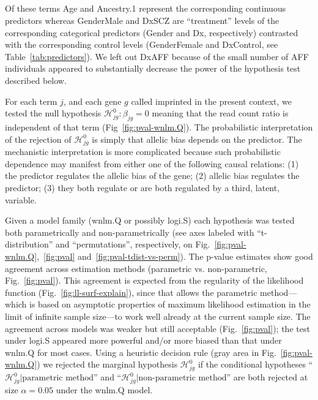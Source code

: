 \documentclass[letterpaper]{article}
\begin{document}
\subsection{}

Of these terms Age
and Ancestry.1 represent the corresponding continuous predictors whereas
GenderMale and DxSCZ are “treatment” levels of the corresponding categorical
predictors (Gender and Dx, respectively) contrasted with the corresponding
control levels (GenderFemale and DxControl, see Table~\ref{tab:predictors}).
We left out DxAFF because of the small number of AFF individuals appeared to
substantially decrease the power of the hypothesis test described below.

For each term \(j\), and each gene \(g\) called imprinted in the present
context, we tested the null hypothesis \(\mathcal{H}^0_{jg} : \beta_{jg} = 0\)
meaning that the read count ratio is independent of that term
(Fig~\ref{fig:pval-wnlm.Q}).  The probabilistic interpretation of the
rejection of \(\mathcal{H}^0_{jg}\) is simply that allelic bias depends on
the predictor.  The mechanistic interpretation is more complicated because
such probabilistic dependence may manifest from either one of the following
causal relations: (1) the predictor regulates the allelic bias of the gene;
(2) allelic bias regulates the predictor; (3) they both regulate or are both
regulated by a third, latent, variable.

Given a model family (wnlm.Q or possibly logi.S) each hypothesis was tested
both parametrically and non-parametrically (see axes labeled with
``t-distribution'' and ``permutations'', respectively, on
Fig.~\ref{fig:pval-wnlm.Q},~\ref{fig:pval} and~\ref{fig:pval-tdist-vs-perm}).
The p-value estimates show good agreement across estimation methods
(parametric vs. non-parametric, Fig.~\ref{fig:pval}). This agreement is
expected from the regularity of the likelihood function
(Fig.~\ref{fig:ll-surf-explain}), since that allows the parametric
method---which is based on asymptotic properties of maximum likelihood
estimation in the limit of infinite sample size---to work well already at the
current sample size. The agreement across models was weaker but still
acceptable (Fig.~\ref{fig:pval}); the test under logi.S appeared more powerful
and/or more biased than that under wnlm.Q for most cases. Using a heuristic
decision rule (gray area in Fig.~\ref{fig:pval-wnlm.Q}) we rejected the
marginal hypothesis \(\mathcal{H}^0_{jg}\) if the conditional hypotheses
``\(\mathcal{H}^0_{jg} |\text{parametric method}\)'' and
``\(\mathcal{H}^0_{jg} |\text{non-parametric method}\)'' are both rejected at
size \(\alpha = 0.05\) under the wnlm.Q model.
\end{document}
